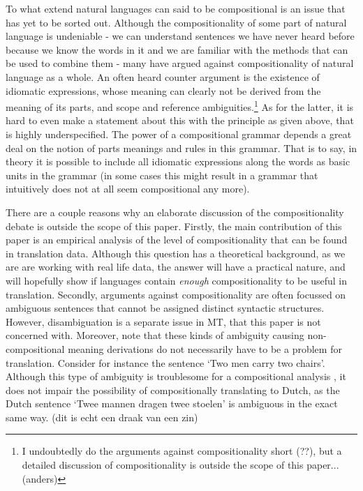 \documentclass{report}
\theoremstyle{definition}
\theoremstyle{plain}
\begin{document}
To what extend natural languages can said to be compositional is an issue that has yet to be sorted out. Although the compositionality of some part of natural language is undeniable - we can understand sentences we have never heard before because we know the words in it and we are familiar with the methods that can be used to combine them - many have argued against compositionality of natural language as a whole. An often heard counter argument is the existence of idiomatic expressions, whose meaning can clearly not be derived from the meaning of its parts, and scope and reference ambiguities.\footnote{I undoubtedly do the arguments against compositionality short (??), but a detailed discussion of compositionality is outside the scope of this paper... (anders)} As for the latter, it is hard to even make a statement about this with the principle as given above, that is highly underspecified. The power of a compositional grammar depends a great deal on the notion of parts meanings and rules in this grammar. That is to say, in theory it is possible to include all idiomatic expressions along the words as basic units in the grammar (in some cases this might result in a grammar that intuitively does not at all seem compositional any more). 

There are a couple reasons why an elaborate discussion of the compositionality debate is outside the scope of this paper. Firstly, the main contribution of this paper is an empirical analysis of the level of compositionality that can be found in translation data. Although this question has a theoretical background, as we are are working with real life data, the answer will have a practical nature, and will hopefully show if languages contain \textit{enough} compositionality to be useful in translation. Secondly, arguments against compositionality are often focussed on ambiguous sentences that cannot be assigned distinct syntactic structures. However, disambiguation is a separate issue in MT, that this paper is not concerned with. Moreover, note that these kinds of ambiguity causing non-compositional meaning derivations do not necessarily have to be a problem for translation. Consider for instance the sentence `Two men carry two chairs'. Although this type of ambiguity is troublesome for a compositional analysis \citep{pelletier1994principle}, it does not impair the possibility of compositionally translating to Dutch, as the Dutch sentence `Twee mannen dragen twee stoelen' is ambiguous in the exact same way. (dit is echt een draak van een zin)
\end{document}
